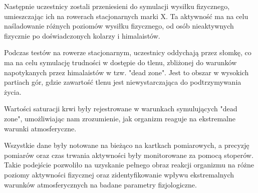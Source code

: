 Następnie uczestnicy zostali przeniesieni do symulacji wysiłku fizycznego, umieszczając ich na rowerach stacjonarnych marki X. Ta aktywność ma na celu naśladowanie różnych poziomów wysiłku fizycznego, od osób nieaktywnych fizycznie po doświadczonych kolarzy i himalaistów.

Podczas testów na rowerze stacjonarnym, uczestnicy oddychają przez słomkę, co ma na celu symulację trudności w dostępie do tlenu, zbliżonej do warunków napotykanych przez himalaistów w tzw. "dead zone". Jest to obszar w wysokich partiach gór, gdzie zawartość tlenu jest niewystarczająca do podtrzymywania życia.

Wartości saturacji krwi były rejestrowane w warunkach symulujących "dead zone", umożliwiając nam zrozumienie, jak organizm reaguje na ekstremalne warunki atmosferyczne.

Wszystkie dane były notowane na bieżąco na kartkach pomiarowych, a precyzję pomiarów oraz czas trwania aktywności były monitorowane za pomocą stoperów. Takie podejście pozwoliło na uzyskanie pełnego obraz reakcji organizmu na różne poziomy aktywności fizycznej oraz zidentyfikowanie wpływu ekstremalnych warunków atmosferycznych na badane parametry fizjologiczne.
